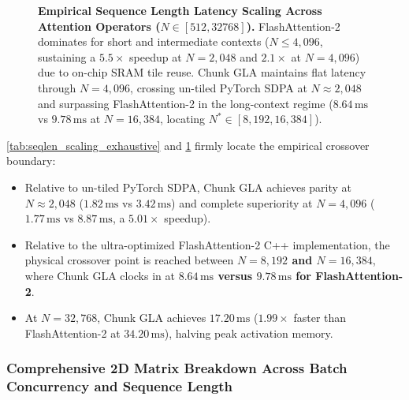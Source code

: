 \begin{figure}[t]
{}
\caption[Empirical Sequence Length Latency Scaling Across Attention Operators (N 512]{\textbf{Empirical Sequence Length Latency Scaling Across Attention Operators ($N \in [512, 32768]$).} FlashAttention-2 dominates for short and intermediate contexts ($N \le 4{,}096$, sustaining a $5.5\times$ speedup at $N=2{,}048$ and $2.1\times$ at $N=4{,}096$) due to on-chip SRAM tile reuse. Chunk GLA maintains flat latency through $N=4{,}096$, crossing un-tiled PyTorch SDPA at $N \approx 2{,}048$ and surpassing FlashAttention-2 in the long-context regime ($8.64\,\text{ms}$ vs $9.78\,\text{ms}$ at $N=16{,}384$, locating $N^* \in [8{,}192, 16{,}384]$).}
\label{fig:seqlen_crossover_plot}
\end{figure}

\cref{tab:seqlen_scaling_exhaustive} and \cref{fig:seqlen_crossover_plot} firmly locate the empirical crossover boundary:
\begin{itemize}
    \item Relative to un-tiled PyTorch SDPA, Chunk GLA achieves parity at $N \approx 2{,}048$ ($1.82\,\text{ms}$ vs $3.42\,\text{ms}$) and complete superiority at $N=4{,}096$ ($1.77\,\text{ms}$ vs $8.87\,\text{ms}$, a $5.01\times$ speedup).
    \item Relative to the ultra-optimized FlashAttention-2 C++ implementation, the physical crossover point is reached between \textbf{$N=8{,}192$ and $N=16{,}384$}, where Chunk GLA clocks in at \textbf{$8.64\,\text{ms}$ versus $9.78\,\text{ms}$ for FlashAttention-2}.
    \item At $N=32{,}768$, Chunk GLA achieves $17.20\,\text{ms}$ ($1.99\times$ faster than FlashAttention-2 at $34.20\,\text{ms}$), halving peak activation memory.
\end{itemize}

\subsubsection{Comprehensive 2D Matrix Breakdown Across Batch Concurrency and Sequence Length}
\label{sec:results_2d_grid_scaling}

